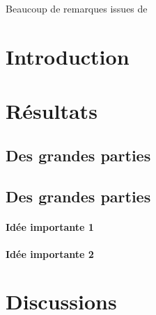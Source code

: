 Beaucoup de remarques issues de \cite{intergovernmental_panel_on_climate_change_ipcc_mitigation_2023}



\section{Introduction}




\section{Résultats}

\subsection{Des grandes parties}

\subsection{Des grandes parties}

\paragraph{Idée importante 1}

\paragraph{Idée importante 2}



\section{Discussions}








